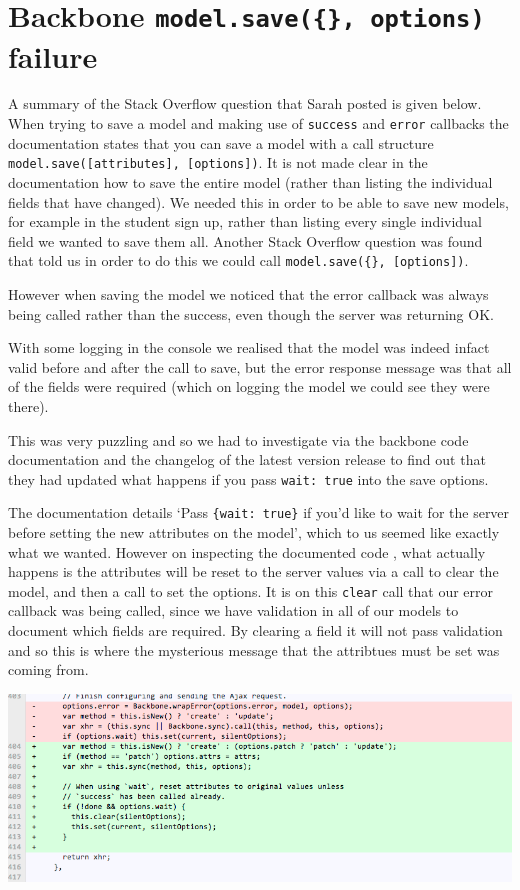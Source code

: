 \section{Backbone \texttt{model.save(\{\}, options)} failure}
A summary of the Stack Overflow question\cite{so_model_save} that Sarah posted is given below.
When trying to save a model and making use of \verb!success! and \verb!error! callbacks the documentation states that you can save a model with a call structure \verb!model.save([attributes], [options])!. 
It is not made clear in the documentation how to save the entire model (rather than listing the individual fields that have changed). We needed this in order to be able to save new models, for example in the student sign up, rather than listing every single individual field we wanted to save them all.
Another Stack Overflow question\cite{so_save_all_fields} was found that told us in order to do this we could call \verb!model.save({}, [options])!.

However when saving the model we noticed that the error callback was always being called rather than the success, even though the server was returning OK.

With some logging in the console we realised that the model was indeed infact valid before and after the call to save, but the error response message was that all of the fields were required (which on logging the model we could see they were there).

This was very puzzling and so we had to investigate via the backbone code documentation\cite{backbone_code} and the changelog of the latest version release\cite{backbone_change_log} to find out that they had updated what happens if you pass \verb!wait: true! into the save options.

The documentation details `Pass \verb!{wait: true}! if you'd like to wait for the server before setting the new attributes on the model', which to us seemed like exactly what we wanted. 
However on inspecting the documented code , what actually happens is the attributes will be reset to the server values via a call to clear the model, and then a call to set the options.
It is on this \verb!clear! call that our error callback was being called, since we have validation in all of our models
to document which fields are required. By clearing a field it will not pass validation and so this is where the mysterious message that the attribtues must be set was coming from.

\begin{center}
\includegraphics[scale=0.5]{images/appendix/backbone_changelog}
\end{center}

